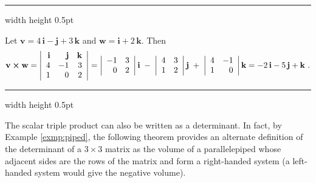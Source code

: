 \smallskip
\hrule width \textwidth height 0.5pt
\begin{exmp}
 Let $\textbf{v} = 4\,\textbf{i} - \textbf{j} + 3\,\textbf{k}$ and $\textbf{w} = \textbf{i} + 2\,\textbf{k}$. Then
 \begin{displaymath}
  \textbf{v} \bm{\times} \textbf{w} =
  \left|
  \begin{array}{rrr}
   \textbf{i} & \textbf{j} & \textbf{k}\\
   4 & -1 & 3\\
   1 & 0 & 2
  \end{array}\right|
  = \left|\begin{array}{rr} -1 & 3 \\ 0 & 2 \end{array}\right| \textbf{i} \;-\;
  \left|\begin{array}{rr} 4 & 3 \\ 1 & 2 \end{array}\right| \textbf{j} \;+\;
  \left|\begin{array}{rr} 4 & -1 \\ 1 & 0 \end{array}\right| \textbf{k}
  = -2\,\textbf{i} - 5\,\textbf{j} + \textbf{k} ~.
 \end{displaymath}
\end{exmp}
\hrule width \textwidth height 0.5pt
\smallskip

The scalar triple product can also be written as a determinant. In fact, by Example \ref{exmp:piped}, the following
theorem provides an alternate definition of the determinant of a $3 \times 3$ matrix as the volume
of a parallelepiped whose adjacent sides are the rows of the matrix and form a right-handed system (a
left-handed system would give the negative volume).


